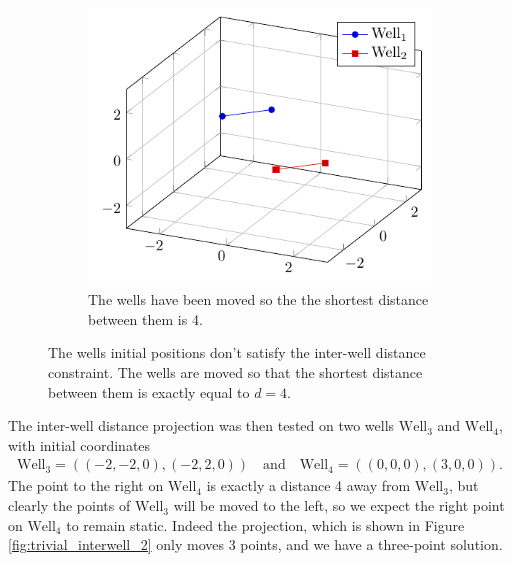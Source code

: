 \begin{figure}[H]
\begin{subfigure}{0.44\textwidth}
		\includegraphics[width=1\textwidth]{figures/interwell_distance_two_wells/initial_moved.pdf}
		\caption{The wells have been moved so the the shortest distance between them is 4.}
	\end{subfigure}
	\caption{The wells initial positions don't satisfy the inter-well distance constraint. The wells
						are moved so that the shortest distance between them is exactly equal to $d = 4$.}
	\label{fig:trivial_interwell_1}
\end{figure}
%
The inter-well distance projection was then tested on two 
wells $\text{Well}_3$ and $\text{Well}_4$, with initial
coordinates 
%
\begin{align*}
\text{Well}_3 = \left( (-2,-2,0), (-2,2,0) \right) \quad \text{and} \quad  \text{Well}_4 = \left( (0,0,0), (3,0,0) \right).
\end{align*}
%
The point to the right on $\text{Well}_4$ is exactly a distance 4 away from $\text{Well}_3$,
but clearly the points of $\text{Well}_3$ will be moved to the left, so we expect the right
point on $\text{Well}_4$ to remain static. Indeed the projection, which is shown in Figure
\ref{fig:trivial_interwell_2} only moves 3 points, and we have a three-point solution.
%
